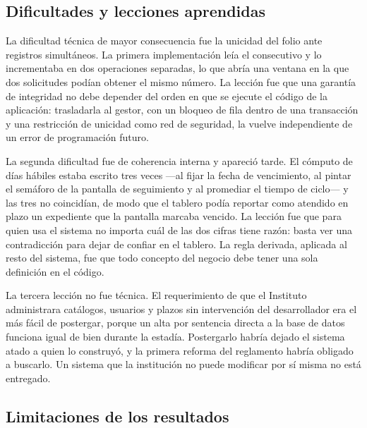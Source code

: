 \subsection{Dificultades y lecciones aprendidas}

La dificultad técnica de mayor consecuencia fue la unicidad del folio ante registros simultáneos. La primera implementación leía el consecutivo y lo incrementaba en dos operaciones separadas, lo que abría una ventana en la que dos solicitudes podían obtener el mismo número. La lección fue que una garantía de integridad no debe depender del orden en que se ejecute el código de la aplicación: trasladarla al gestor, con un bloqueo de fila dentro de una transacción y una restricción de unicidad como red de seguridad, la vuelve independiente de un error de programación futuro.

La segunda dificultad fue de coherencia interna y apareció tarde. El cómputo de días hábiles estaba escrito tres veces —al fijar la fecha de vencimiento, al pintar el semáforo de la pantalla de seguimiento y al promediar el tiempo de ciclo— y las tres no coincidían, de modo que el tablero podía reportar como atendido en plazo un expediente que la pantalla marcaba vencido. La lección fue que para quien usa el sistema no importa cuál de las dos cifras tiene razón: basta ver una contradicción para dejar de confiar en el tablero. La regla derivada, aplicada al resto del sistema, fue que todo concepto del negocio debe tener una sola definición en el código.

La tercera lección no fue técnica. El requerimiento de que el Instituto administrara catálogos, usuarios y plazos sin intervención del desarrollador era el más fácil de postergar, porque un alta por sentencia directa a la base de datos funciona igual de bien durante la estadía. Postergarlo habría dejado el sistema atado a quien lo construyó, y la primera reforma del reglamento habría obligado a buscarlo. Un sistema que la institución no puede modificar por sí misma no está entregado.

\subsection{Limitaciones de los resultados}

